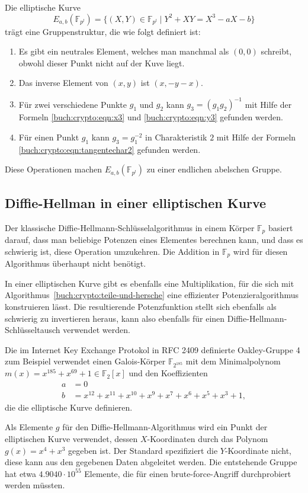 \begin{satz}
Die elliptische Kurve
\[
E_{a,b}(\mathbb{F}_{p^l})
=
\{
(X,Y)\in\mathbb{F}_{p^l}
\mid
Y^2+XY = X^3-aX-b
\}
\]
trägt eine Gruppenstruktur, die wie folgt definiert ist:
\begin{enumerate}
\item Es gibt ein neutrales Element, welches man manchmal als $(0,0)$
schreibt, obwohl dieser Punkt nicht auf der Kuve liegt.
\item Das inverse Element von $(x,y)$ ist $(x,-y-x)$.
\item Für zwei verschiedene Punkte $g_1$ und $g_2$ kann $g_3=(g_1g_2)^{-1}$
mit Hilfe der Formeln
\eqref{buch:crypto:eqn:x3}
und
\eqref{buch:crypto:eqn:y3}
gefunden werden.
\item Für einen Punkt $g_1$ kann $g_3=g_1^{-2}$ in Charakteristik $2$ mit
Hilfe der Formeln
\eqref{buch:crypto:eqn:tangentechar2}
gefunden werden.
\end{enumerate}
Diese Operationen machen $E_{a,b}(\mathbb{F}_{p^l})$ zu einer endlichen
abelschen Gruppe.
\end{satz}

\subsection{Diffie-Hellman in einer elliptischen Kurve}
Der klassische Diffie-Hellmann-Schlüsselalgorithmus in einem Körper
$\mathbb{F}_p$ basiert darauf, dass man beliebige Potenzen eines 
Elementes berechnen kann, und dass es schwierig ist, diese Operation
umzukehren.
Die Addition in $\mathbb{F}_p$ wird für diesen Algorithmus überhaupt
nicht benötigt.

In einer elliptischen Kurve gibt es ebenfalls eine Multiplikation,
für die sich mit Algorithmus~\ref{buch:crypto:teile-und-hersche}
eine effizienter Potenzieralgorithmus konstruieren lässt.
Die resultierende Potenzfunktion stellt sich ebenfalls als 
schwierig zu invertieren heraus, kann also ebenfalls für einen
Diffie-Hellmann-Schlüsseltausch verwendet werden.

Die im Internet Key Exchange Protokol
in RFC 2409
\cite{buch:rfc2409}
definierte Oakley-Gruppe 4
zum Beispiel verwendet einen Galois-Körper $\mathbb{F}_{2^{185}}$ 
mit dem Minimalpolynom $m(x)=x^{185}+x^{69}+1\in \mathbb{F}_2[x]$
und den Koeffizienten
\begin{align*}
a&=0\\
b&=x^{12}+x^{11} + x^{10} + x^9 + x^7 + x^6 + x^5 + x^3 +1,
\end{align*} 
die die elliptische Kurve definieren.

Als Elemente $g$ für den Diffie-Hellmann-Algorithmus wird ein Punkt
der elliptischen Kurve verwendet, dessen $X$-Koordinaten durch das
Polynom $g(x) = x^4+x^3$ gegeben ist.
Der Standard spezifiziert die $Y$-Koordinate nicht, diese kann aus
den gegebenen Daten abgeleitet werden.
Die entstehende Gruppe hat etwa $4.9040\cdot10^{55}$ Elemente, die
für einen brute-force-Angriff durchprobiert werden müssten.








